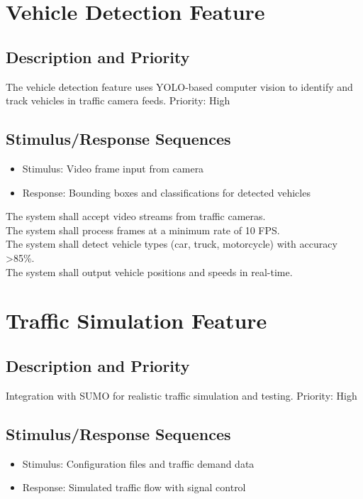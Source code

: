 \section{Vehicle Detection Feature}

\subsection{Description and Priority}
The vehicle detection feature uses YOLO-based computer vision to identify and track vehicles in traffic camera feeds. Priority: High

\subsection{Stimulus/Response Sequences}
\begin{itemize}
\item Stimulus: Video frame input from camera
\item Response: Bounding boxes and classifications for detected vehicles
\end{itemize}

\req The system shall accept video streams from traffic cameras. \\
\req The system shall process frames at a minimum rate of 10 FPS. \\
\req The system shall detect vehicle types (car, truck, motorcycle) with accuracy >85\%. \\
\req The system shall output vehicle positions and speeds in real-time.

\section{Traffic Simulation Feature}

\subsection{Description and Priority}
Integration with SUMO for realistic traffic simulation and testing. Priority: High

\subsection{Stimulus/Response Sequences}
\begin{itemize}
\item Stimulus: Configuration files and traffic demand data
\item Response: Simulated traffic flow with signal control
\end{itemize}

